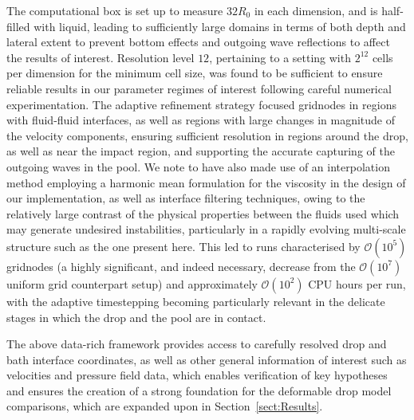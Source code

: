 The computational box is set up to measure $32R_0$ in each dimension, and is half-filled with liquid, leading to sufficiently large domains in terms of both depth and lateral extent to prevent bottom effects and outgoing wave reflections to affect the results of interest. Resolution level $12$, pertaining to a setting with $2^{12}$ cells per dimension for the minimum cell size, was found to be sufficient to ensure reliable results in our parameter regimes of interest following careful numerical experimentation. The adaptive refinement strategy focused gridnodes in regions with fluid-fluid interfaces, as well as regions with large changes in magnitude of the velocity components, ensuring sufficient resolution in regions around the drop, as well as near the impact region, and supporting the accurate capturing of the outgoing waves in the pool. We note to have also made use of an interpolation method employing a harmonic mean formulation for the viscosity in the design of our implementation, as well as interface filtering techniques, owing to the relatively large contrast of the physical properties between the fluids used which may generate undesired instabilities, particularly in a rapidly evolving multi-scale structure such as the one present here. This led to runs characterised by $\mathcal{O}(10^5)$ gridnodes (a highly significant, and indeed necessary, decrease from the $\mathcal{O}(10^7)$ uniform grid counterpart setup) and approximately $\mathcal{O}(10^2)$ CPU hours per run, with the adaptive timestepping becoming particularly relevant in the delicate stages in which the drop and the pool are in contact.

The above data-rich framework provides access to carefully resolved drop and bath interface coordinates, as well as other general information of interest such as velocities and pressure field data, which enables verification of key hypotheses and ensures the creation of a strong foundation for the deformable drop model comparisons, which are expanded upon in Section~\ref{sect:Results}.
